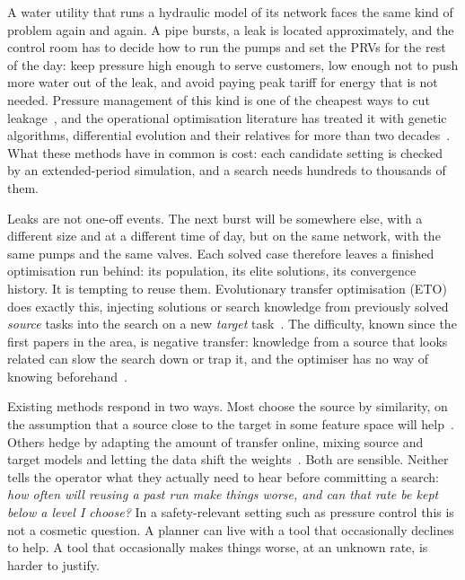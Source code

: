 \documentclass[11pt]{article}
\begin{document}
A water utility that runs a hydraulic model of its network faces the same kind of problem again and again. A pipe
bursts, a leak is located approximately, and the control room has to decide how to run the pumps and set the
PRVs for the rest of the day: keep pressure high enough to serve customers, low enough not to push more water out
of the leak, and avoid paying peak tariff for energy that is not needed. Pressure management of this kind is one
of the cheapest ways to cut leakage~\citep{vairavamoorthy1998leakage,araujo2006pressure}, and the operational
optimisation literature has treated it with genetic algorithms, differential evolution and their
relatives for more than two decades~\citep{vanzyl2004operational,malajetmarova2017lost,creaco2018comparison}. What
these methods have in common is cost: each candidate setting is checked by an extended-period simulation, and a
search needs hundreds to thousands of them.

Leaks are not one-off events. The next burst will be somewhere else, with a different size and at a different
time of day, but on the same network, with the same pumps and the same valves. Each solved case therefore leaves a
finished optimisation run behind: its population, its elite solutions, its convergence history. It is tempting to
reuse them. Evolutionary transfer optimisation (ETO) does exactly this, injecting solutions or search knowledge from
previously solved \emph{source} tasks into the search on a new \emph{target}
task~\citep{gupta2018insights,tan2021eto,xue2024solution}. The difficulty, known since the first papers in the
area, is negative transfer: knowledge from a source that looks related can slow the search down or trap it, and the
optimiser has no way of knowing beforehand~\citep{da2019curbing,xue2024solution}.

Existing methods respond in two ways. Most choose the source by similarity, on the assumption that a source close
to the target in some feature space will help~\citep{feng2017autoencoding,fang2026seeto}. Others hedge by adapting
the amount of transfer online, mixing source and target models and letting the data shift the
weights~\citep{da2019curbing,lu2025bckt}. Both are sensible. Neither tells the operator what they actually need to
hear before committing a search: \emph{how often will reusing a past run make things worse, and can that rate be
kept below a level I choose?} In a safety-relevant setting such as pressure control this is not a cosmetic
question. A planner can live with a tool that occasionally declines to help. A tool that occasionally makes things
worse, at an unknown rate, is harder to justify.
\end{document}
